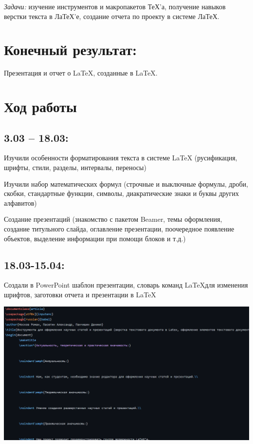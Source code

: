 \documentclass{article}
\begin{document}
	
	\noindent\emph{Задачи:} изучение инструментов и макропакетов ТеХ'а, получение навыков верстки текста в ЛаТеХ'е, создание отчета по проекту в системе ЛаТеХ.
	
	
	\section{Конечный результат:}
	Презентация и отчет о \LaTeX, созданные в \LaTeX.
	
	\section{Ход работы}
	\subsection*{3.03 – 18.03:}
	Изучили особенности форматирования текста в системе LaTeX (русификация, шрифты, стили, разделы, интервалы, переносы)
	
	Изучили набор математических формул (строчные и выключные формулы, дроби, скобки, стандартные функции, символы, диакратические знаки и буквы других алфавитов)
	
	Создание презентаций (знакомство с пакетом Beamer, темы оформления, создание титульного слайда, оглавление презентации, поочередное появление объектов, выделение информации при помощи блоков и т.д.)
	
	\subsection*{18.03-15.04:}
	Создали в PowerPoint шаблон презентации, словарь команд \LaTeX для изменения шрифтов, заготовки отчета и презентации в \LaTeX
	
	\includegraphics[width=\linewidth]{1}
	
\end{document}
